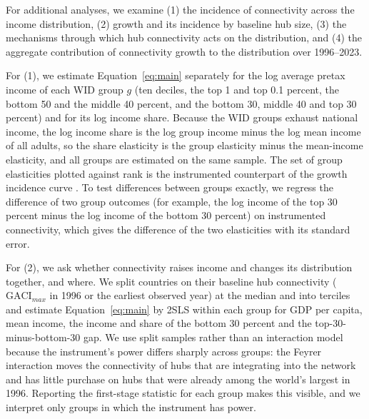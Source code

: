 For additional analyses, we examine (1) the incidence of connectivity across the income distribution, (2) growth and its incidence by baseline hub size, (3) the mechanisms through which hub connectivity acts on the distribution, and (4) the aggregate contribution of connectivity growth to the distribution over 1996--2023.

For (1), we estimate Equation~\eqref{eq:main} separately for the log average pretax income of each WID group $g$ (ten deciles, the top 1 and top 0.1 percent, the bottom 50 and the middle 40 percent, and the bottom 30, middle 40 and top 30 percent) and for its log income share. Because the WID groups exhaust national income, the log income share is the log group income minus the log mean income of all adults, so the share elasticity is the group elasticity minus the mean-income elasticity, and all groups are estimated on the same sample. The set of group elasticities plotted against rank is the instrumented counterpart of the growth incidence curve \citep{Ravallion_2003}. To test differences between groups exactly, we regress the difference of two group outcomes (for example, the log income of the top 30 percent minus the log income of the bottom 30 percent) on instrumented connectivity, which gives the difference of the two elasticities with its standard error.

For (2), we ask whether connectivity raises income and changes its distribution together, and where. We split countries on their baseline hub connectivity ($\mathrm{GACI}_{max}$ in 1996 or the earliest observed year) at the median and into terciles and estimate Equation~\eqref{eq:main} by 2SLS within each group for GDP per capita, mean income, the income and share of the bottom 30 percent and the top-30-minus-bottom-30 gap. We use split samples rather than an interaction model because the instrument's power differs sharply across groups: the Feyrer interaction moves the connectivity of hubs that are integrating into the network and has little purchase on hubs that were already among the world's largest in 1996. Reporting the first-stage statistic for each group makes this visible, and we interpret only groups in which the instrument has power.

